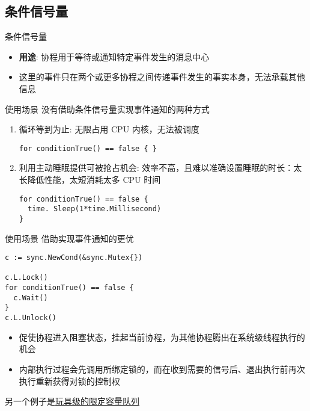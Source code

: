 \subsection{条件信号量\Cond}
\begin{frame}{条件信号量\Cond}
    \begin{itemize}
        \item \textbf{用途}: 协程用于等待或通知特定事件发生的消息中心
        \item 这里的事件只在两个或更多协程之间传递事件发生的事实本身，\alert{无法承载其他信息}
    \end{itemize}
\end{frame}

\begin{frame}[fragile]{使用场景}
   没有借助条件信号量实现事件通知的两种方式
   
   \begin{enumerate}
       \item {}循环等到为止: 无限占用 CPU 内核，\alert{无法被调度}
\begin{lstlisting}
for conditionTrue() == false { }    
\end{lstlisting}
       \item 利用主动睡眠提供可被抢占机会: \alert{效率不高，且难以准确设置睡眠的时长}：太长降低性能，太短消耗太多 CPU 时间    
\begin{lstlisting}
for conditionTrue() == false {
  time. Sleep(1*time.Millisecond)
}
\end{lstlisting}
   \end{enumerate}
\end{frame}

\begin{frame}[fragile]{使用场景}
   借助\Cond 实现事件通知的更优
\begin{lstlisting}
c := sync.NewCond(&sync.Mutex{})

c.L.Lock()
for conditionTrue() == false {
  c.Wait()
}
c.L.Unlock()
\end{lstlisting}

\begin{itemize}
    \item {}促使协程进入阻塞状态，挂起当前协程，为其他协程腾出在系统级线程执行的机会
    \item {}内部执行过程会先调用所绑定锁的，而在收到需要的信号后、退出执行前再次执行重新获得对锁的控制权
\end{itemize}

另一个例子是\href{https://github.com/sammyne/concurrency-in-go/blob/master/chapter03/sync.pkg/cond/queue.go}{玩具级的限定容量队列}
\end{frame}

